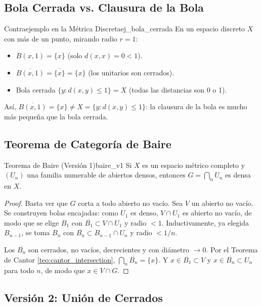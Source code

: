 \documentclass[11pt, a4paper]{article}
\begin{document}
\subsection{Bola Cerrada vs. Clausura de la Bola}

\begin{ejemplo}{Contraejemplo en la Métrica Discreta}{ej_bola_cerrada}
En un espacio discreto $X$ con más de un punto, mirando radio $r = 1$:
\begin{itemize}
    \item $B(x, 1) = \{x\}$ (solo $d(x,x) = 0 < 1$).
    \item $\overline{B(x, 1)} = \overline{\{x\}} = \{x\}$ (los unitarios son cerrados).
    \item Bola cerrada $\{y : d(x,y) \le 1\} = X$ (todas las distancias son 0 o 1).
\end{itemize}
Así, $\overline{B(x, 1)} = \{x\} \ne X = \{y : d(x,y) \le 1\}$: la clausura de la bola es mucho
más pequeña que la bola cerrada.
\end{ejemplo}

\subsection{Teorema de Categoría de Baire}

\begin{teorema}{Teorema de Baire (Versión 1)}{baire_v1}
Si $X$ es un espacio métrico completo y $(U_n)$ una familia numerable de abiertos densos, entonces
$G = \bigcap_n U_n$ es densa en $X$.
\end{teorema}

\begin{proof}
Basta ver que $G$ corta a todo abierto no vacío. Sea $V$ un abierto no vacío. Se construyen bolas
encajadas: como $U_1$ es denso, $V \cap U_1$ es abierto no vacío, de modo que se elige $B_1$ con
$\overline{B_1} \subset V \cap U_1$ y radio $< 1$. Inductivamente, ya elegida $B_{n-1}$, se toma
$B_n$ con $\overline{B_n} \subset B_{n-1} \cap U_n$ y radio $< 1/n$.

Los $\overline{B_n}$ son cerrados, no vacíos, decrecientes y con diámetro $\to 0$. Por el Teorema
de Cantor \ref{teo:cantor_intersection}, $\bigcap_n \overline{B_n} = \{x\}$. Y $x \in \overline{B_1} \subset V$ y
$x \in \overline{B_n} \subset U_n$ para todo $n$, de modo que $x \in V \cap G$.
\end{proof}

\subsection{Versión 2: Unión de Cerrados}
\end{document}

